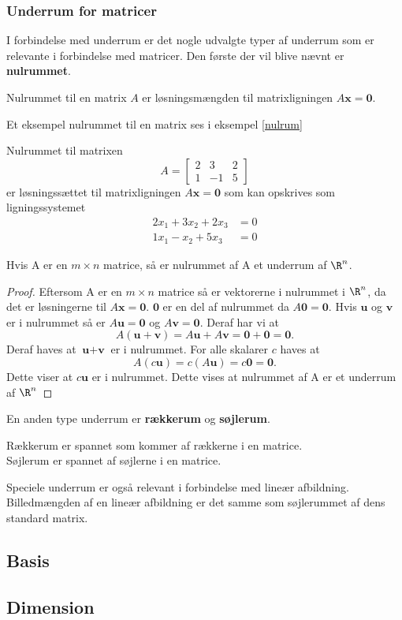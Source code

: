\subsubsection{Underrum for matricer}
I forbindelse med underrum er det nogle udvalgte typer af underrum som er relevante i forbindelse med matricer. Den første der vil blive nævnt er \textbf{nulrummet}.
\begin{defn}{}{}
Nulrummet til en matrix $A$ er løsningsmængden til matrixligningen $A\textbf{x}=\textbf{0}$. 
\end{defn}
Et eksempel nulrummet til en matrix ses i eksempel \ref{nulrum}

\begin{eks}\label{nulrum}
Nulrummet til matrixen
$$A=\begin{bmatrix}
2 & 3 & 2\\
1 & -1 & 5
\end{bmatrix}$$
er løsningssættet til matrixligningen $A\textbf{x}=\textbf{0}$
som kan opskrives som ligningssystemet
\begin{align*}
2x_1+3x_2+2x_3&=0\\
1x_1-x_2+5x_3&=0
\end{align*}
\end{eks} 
\begin{thm}{}{}
Hvis A er en $m\times n$ matrice, så er nulrummet af A et underrum af $\R^n$.
\end{thm}
\begin{proof}
Eftersom A er en $m\times n$ matrice så er vektorerne i nulrummet i $\R^n$, da det er løsningerne til $A\textbf{x}=\textbf{0}$. $\textbf{0}$ er en del af nulrummet da $A\textbf{0}=\textbf{0}$. Hvis $\textbf{u}$ og $\textbf{v}$ er i nulrummet så er $A\textbf{u}=\textbf{0}$ og $A\textbf{v}=\textbf{0}$. Deraf har vi at
$$A(\textbf{u}+\textbf{v})=A\textbf{u}+A\textbf{v}=\textbf{0}+\textbf{0}=\textbf{0}.$$
Deraf haves at $\textbf{u}+\textbf{v}$ er i nulrummet. For alle skalarer $c$ haves at
$$A(c\textbf{u})=c(A\textbf{u})=c\textbf{0}=\textbf{0}.$$
Dette viser at $c\textbf{u}$ er i nulrummet.
Dette vises at nulrummet af A er et underrum af $\R^n$
\end{proof}
\noindent
En anden type underrum er \textbf{rækkerum} og \textbf{søjlerum}.
\begin{defn}{}{}
Rækkerum er spannet som kommer af rækkerne i en matrice.\\
Søjlerum er spannet af søjlerne i en matrice.
\end{defn}
\noindent
Speciele underrum er også relevant i forbindelse med lineær afbildning.
Billedmængden af en lineær afbildning er det samme som søjlerummet af dens standard matrix.

\subsection{Basis}




\subsection{Dimension}